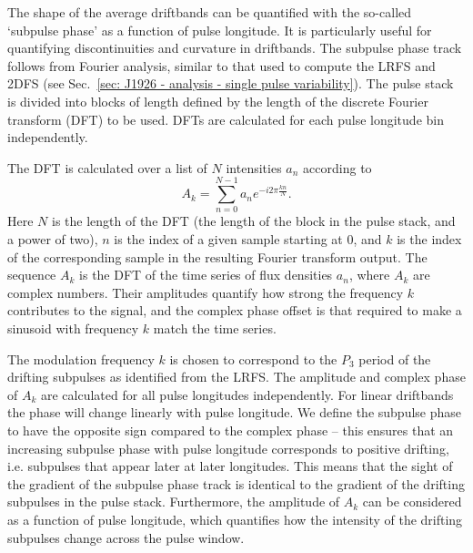 The shape of the average driftbands can be quantified with the so-called `subpulse phase' as a function of pulse longitude. It is particularly useful for quantifying discontinuities and curvature in driftbands. The subpulse phase track follows from Fourier analysis, similar to that used to compute the LRFS and 2DFS (see Sec.~\ref{sec: J1926 - analysis - single pulse variability}). The pulse stack is divided into blocks of length defined by the length of the discrete Fourier transform (DFT) to be used. DFTs are calculated for each pulse longitude bin independently.

The DFT is calculated over a list of $N$ intensities $a_n$ according to
\begin{equation}
    A_k = \sum^{N-1}_{n=0} a_n e^{-i2\pi \frac{kn}{N}}.
\end{equation}
Here $N$ is the length of the DFT (the length of the block in the pulse stack, and a power of two), $n$ is the index of a given sample starting at $0$, and $k$ is the index of the corresponding sample in the resulting Fourier transform output. The sequence $A_k$ is the DFT of the time series of flux densities $a_n$, where $A_k$ are complex numbers. Their amplitudes quantify how strong the frequency $k$ contributes to the signal, and the complex phase offset is that required to make a sinusoid with frequency $k$ match the time series. 

The modulation frequency $k$ is chosen to correspond to the $P_3$ period of the drifting subpulses as identified from the LRFS. The amplitude and complex phase of $A_k$ are calculated for all pulse longitudes independently. For linear driftbands the phase will change linearly with pulse longitude. We define the subpulse phase to have the opposite sign compared to the complex phase -- this ensures that an increasing subpulse phase with pulse longitude corresponds to positive drifting, i.e. subpulses that appear later at later longitudes. This means that the sight of the gradient of the subpulse phase track is identical to the gradient of the drifting subpulses in the pulse stack. Furthermore, the amplitude of $A_k$ can be considered as a function of pulse longitude, which quantifies how the intensity of the drifting subpulses change across the pulse window.


